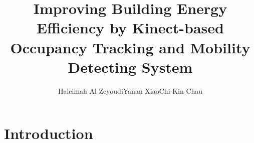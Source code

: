 \documentclass{sig-alternate}
\begin{document}
\title{Improving Building Energy Efficiency by Kinect-based Occupancy
  Tracking and Mobility Detecting System}

\author{
\alignauthor
Haleimah Al Zeyoudi\quad Yanan Xiao\quad Chi-Kin Chau\\
}



\maketitle{}



\begin{abstract}
  
\end{abstract}









\section{Introduction}
\label{sec:introduction}
\end{document}
